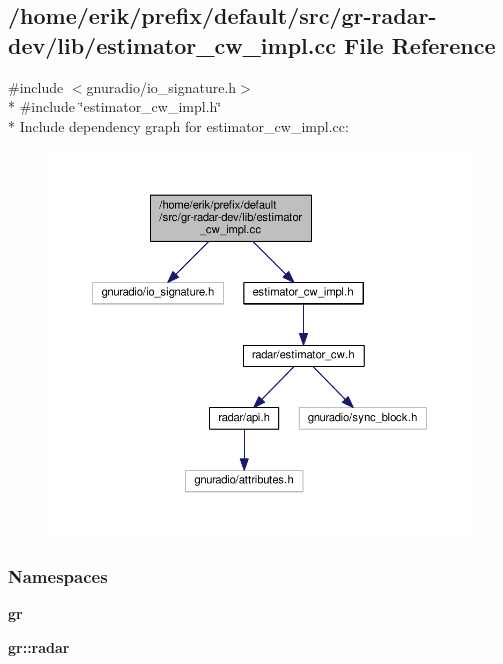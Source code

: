 \subsection{/home/erik/prefix/default/src/gr-\/radar-\/dev/lib/estimator\+\_\+cw\+\_\+impl.cc File Reference}
\label{estimator__cw__impl_8cc}
{\ttfamily \#include $<$gnuradio/io\+\_\+signature.\+h$>$}\\*
{\ttfamily \#include \char`\"{}estimator\+\_\+cw\+\_\+impl.\+h\char`\"{}}\\*
Include dependency graph for estimator\+\_\+cw\+\_\+impl.\+cc\+:
\nopagebreak
\begin{figure}[H]
\begin{center}
\leavevmode
\includegraphics[width=350pt]{d3/d93/estimator__cw__impl_8cc__incl}
\end{center}
\end{figure}
\subsubsection*{Namespaces}
\begin{DoxyCompactItemize}
\item 
 {\bf gr}
\item 
 {\bf gr\+::radar}
\end{DoxyCompactItemize}
